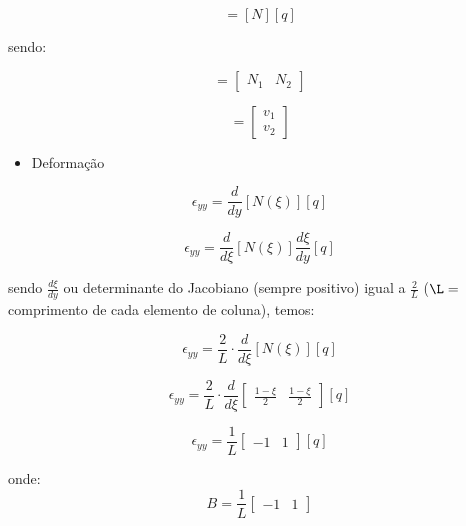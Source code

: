 \documentclass{article} %
\begin{document}
\begin{equation*}
[v]=[N][q]
\end{equation*}

\indent sendo:

\begin{equation}
[N]=\begin{bmatrix}
N_1& N_2 
\end{bmatrix}
\end{equation}

\begin{equation}
[q]=\begin{bmatrix}
v_1\\ v_2 
\end{bmatrix}
\end{equation}

\begin{itemize}
	\item Deformação
\end{itemize}

\begin{equation}
\epsilon_{yy}=\frac{d}{dy}[N(\xi)][q]
\end{equation}

\begin{equation*}
\epsilon_{yy}=\frac{d}{d\xi}[N(\xi)]\frac{d\xi}{dy}[q]
\end{equation*}
 
 \indent sendo \(\frac{d\xi}{dy}\) ou determinante do Jacobiano (sempre positivo) igual a \(\frac{2}{L}\) (\(\L=\) comprimento de cada elemento de coluna), temos:
 
\begin{equation}\label{def}
\epsilon_{yy}=\frac{2}{L}\cdot\frac{d}{d\xi}[N(\xi)][q]
\end{equation}

\begin{equation*}
\epsilon_{yy}=\frac{2}{L}\cdot\frac{d}{d\xi}\begin{bmatrix}
\frac{1-\xi}{2}&\frac{1-\xi}{2}
\end{bmatrix}[q]
\end{equation*}

\begin{equation}\label{defor}
\epsilon_{yy}=\frac{1}{L}\begin{bmatrix}
-1&1
\end{bmatrix}[q]
\end{equation}

\indent onde:
\begin{equation}\label{matrizb}
 B=\frac{1}{L}\begin{bmatrix}
-1&1
\end{bmatrix}
\end{equation}
\end{document}
